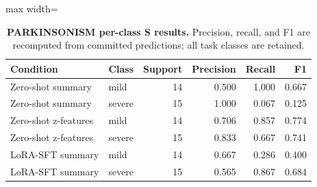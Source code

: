\begin{table}[H]
\centering
\caption{\textbf{PARKINSONISM per-class S results.} Precision, recall, and F1 are recomputed from committed predictions; all task classes are retained.}
\label{tab:per_class_parkinsonism}
\small
\begin{adjustbox}{max width=\textwidth}
\begin{tabular}{llrrrr}
\toprule
Condition & Class & Support & Precision & Recall & F1 \\
\midrule
Zero-shot summary & mild & 14 & 0.500 & 1.000 & 0.667 \\
Zero-shot summary & severe & 15 & 1.000 & 0.067 & 0.125 \\
Zero-shot z-features & mild & 14 & 0.706 & 0.857 & 0.774 \\
Zero-shot z-features & severe & 15 & 0.833 & 0.667 & 0.741 \\
LoRA-SFT summary & mild & 14 & 0.667 & 0.286 & 0.400 \\
LoRA-SFT summary & severe & 15 & 0.565 & 0.867 & 0.684 \\
\bottomrule
\end{tabular}
\end{adjustbox}
\end{table}
